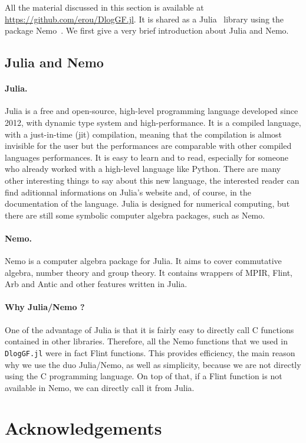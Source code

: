\documentclass[a4paper,11pt]{article}
\theoremstyle{break}
\theoremstyle{sc}
\theoremstyle{definition}
\theoremstyle{remark}
\begin{document}
All the material discussed in this section is available at
\url{https://github.com/erou/DlogGF.jl}. It is shared as a
Julia~\cite{Julia} library using the package Nemo~\cite{Nemo}. We first give
a very brief introduction about Julia and Nemo.
\subsection{Julia and Nemo}
\paragraph{Julia.} Julia is a free and open-source, high-level
programming language developed
since 2012, with dynamic type system and high-performance. It is a compiled
language, with a just-in-time (jit) compilation, meaning that the compilation
is almost invisible for the user but the performances are comparable with
other compiled languages performances. It is easy to learn and to read,
especially for someone who already worked with a high-level language like
Python. There are many other interesting things to say about this new
language, the interested reader can find aditionnal informations on Julia's
website and, of course, in the documentation of the language. Julia is designed for numerical computing, but there are still some
symbolic computer algebra packages, such as Nemo.

\paragraph{Nemo.} Nemo is a computer algebra package for Julia. It aims to cover
commutative algebra, number theory and group theory. It contains wrappers of
MPIR, Flint, Arb and Antic and other features written in Julia. 

\paragraph{Why Julia/Nemo ?}

One of the advantage of Julia is that it is fairly easy to directly call C
functions contained in other libraries. Therefore, all the Nemo functions
that we used in \texttt{DlogGF.jl} were in fact Flint functions. This
provides efficiency, the main reason why we use the duo Julia/Nemo, as well as
simplicity, because we are not directly using the C programming
language. On top of that, if a Flint function is not available in Nemo, we
can directly call it from Julia.

\section*{Acknowledgements}
\end{document}
